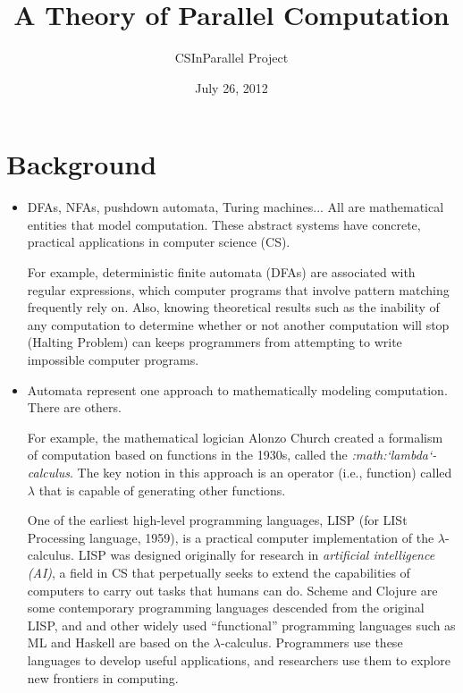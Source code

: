 \documentclass[letterpaper,10pt,openany,oneside]{sphinxmanual}
\title{A Theory of Parallel Computation}
\date{July 26, 2012}
\author{CSInParallel Project}
\begin{document}
\maketitle
\tableofcontents
{}\label{index::doc}



\chapter{Background}
\label{Background/Background::doc}\label{Background/Background:a-theory-of-parallel-computation}\label{Background/Background:background}\begin{itemize}
\item {} 
DFAs, NFAs, pushdown automata, Turing machines... All are mathematical entities that model computation. These abstract systems have concrete, practical applications in computer science (CS).

For example, deterministic finite automata (DFAs) are associated with regular expressions, which computer   programs that involve pattern matching frequently rely on. Also, knowing theoretical results such as the inability of any computation to determine whether or not another computation will stop (Halting Problem) can keeps programmers from attempting to write impossible computer programs.

\item {} 
Automata represent one approach to mathematically modeling computation. There are others.

For example, the mathematical logician Alonzo Church created a formalism of computation based on functions in the 1930s, called the \emph{:math:{}`lambda{}`-calculus}. The key notion in this approach is an operator (i.e., function) called $\lambda$ that is capable of generating other functions.

One of the earliest high-level programming languages, LISP (for LISt Processing language, 1959), is a practical computer implementation of the $\lambda$-calculus. LISP was designed originally for research in \emph{artificial intelligence (AI)}, a field in CS that perpetually seeks to extend the capabilities of computers to carry out tasks that humans can do. Scheme and Clojure are some contemporary programming languages descended from the original LISP, and and other widely used ``functional'' programming languages such as ML and Haskell are based on the $\lambda$-calculus. Programmers use these languages to develop useful applications, and researchers use them to explore new frontiers in computing.


\end{itemize}
\end{document}
